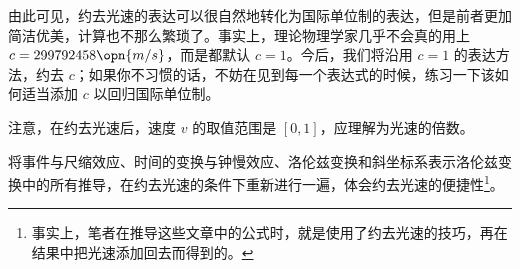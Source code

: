 由此可见，约去光速的表达可以很自然地转化为国际单位制的表达，但是前者更加简洁优美，计算也不那么繁琐了。事实上，理论物理学家几乎不会真的用上 $c=299792458\opn{m/s}$，而是都默认 $c=1$。今后，我们将沿用 $c=1$ 的表达方法，约去 $c$；如果你不习惯的话，不妨在见到每一个表达式的时候，练习一下该如何适当添加 $c$ 以回归国际单位制。

注意，在约去光速后，速度 $v$ 的取值范围是 $[0,1]$，应理解为光速的倍数。

\begin{exercise}{}
将事件与尺缩效应、时间的变换与钟慢效应、洛伦兹变换和斜坐标系表示洛伦兹变换中的所有推导，在约去光速的条件下重新进行一遍，体会约去光速的便捷性\footnote{事实上，笔者在推导这些文章中的公式时，就是使用了约去光速的技巧，再在结果中把光速添加回去而得到的。}。
\end{exercise}


